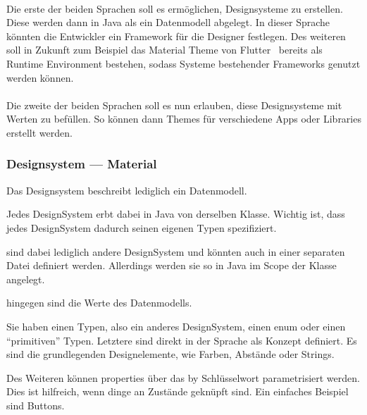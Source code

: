 \paragraph*{}
Die erste der beiden Sprachen soll es ermöglichen, Designsysteme zu erstellen.
Diese werden dann in Java als ein Datenmodell abgelegt.
In dieser Sprache könnten die Entwickler ein Framework für die Designer festlegen.
Des weiteren soll in Zukunft zum Beispiel das Material Theme von Flutter~\autocite{google-ireland-limited-no-date} bereits als Runtime Environment bestehen, sodass Systeme bestehender Frameworks genutzt werden können.

\paragraph*{}
Die zweite der beiden Sprachen soll es nun erlauben, diese Designsysteme mit Werten zu befüllen.
So können dann Themes für verschiedene Apps oder Libraries erstellt werden.

\subsubsection{Designsystem --- Material}
Das Designsystem beschreibt lediglich ein Datenmodell.

Jedes {\ttfamily DesignSystem} erbt dabei in Java von derselben Klasse.
Wichtig ist, dass jedes {\ttfamily DesignSystem} dadurch seinen eigenen Typen spezifiziert.

 sind dabei lediglich andere {\ttfamily DesignSystem} und könnten auch in einer separaten Datei definiert werden.
Allerdings werden sie so in Java im Scope der Klasse angelegt.

 hingegen sind die Werte des Datenmodells.

Sie haben einen Typen, also ein anderes {\ttfamily DesignSystem}, einen {\ttfamily enum} oder einen \enquote{primitiven} Typen.
Letztere sind direkt in der Sprache als Konzept definiert.
Es sind die grundlegenden Designelemente, wie Farben, Abstände oder Strings.

Des Weiteren können {\ttfamily properties} über das {\ttfamily by} Schlüsselwort parametrisiert werden.
Dies ist hilfreich, wenn dinge an Zustände geknüpft sind.
Ein einfaches Beispiel sind Buttons.

